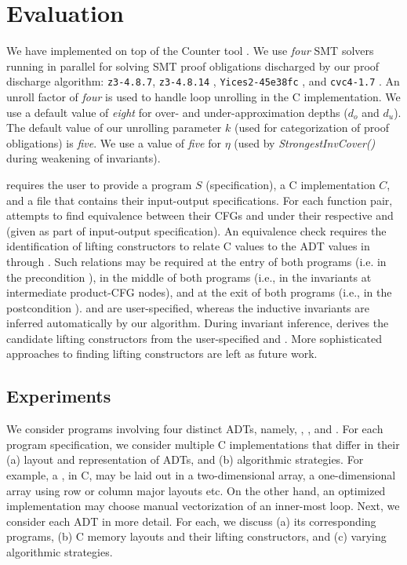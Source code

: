 \chapter{Evaluation}
\label{sec:eval}

We have implemented \toolName{} on top of the Counter tool \cite{oopsla20}.
We use {\em four} SMT solvers running in parallel for solving
SMT proof obligations discharged by our proof discharge algorithm:
{\tt z3-4.8.7}, {\tt z3-4.8.14} \cite{z3}, {\tt Yices2-45e38fc} \cite{yices}, and {\tt cvc4-1.7} \cite{cvc4solver}.
An unroll factor of {\em four} is used to handle loop unrolling in the C implementation.
We use a default value of {\em eight} for over- and under-approximation depths ($d_o$ and $d_u$).
The default value of our unrolling parameter $k$ (used for categorization of proof obligations) is {\em five}.
We use a value of {\em five} for $\eta$ (used by {\em StrongestInvCover()} during weakening of \recursiveRelation{} invariants).

\toolName{} requires the user to provide a \SpecL{} program $S$ (specification), a C implementation $C$,
and a file that contains their input-output specifications.
For each function pair, \toolName{} attempts to find equivalence between their CFGs \sprog{} and \cprog{}
under their respective \pre{} and \post{} (given as part of input-output specification).
An equivalence check requires the identification of lifting constructors to relate C
values to the ADT values in \SpecL{} through  \recursiveRelations{}.
Such relations may be required at the entry of both programs (i.e. in the precondition \pre{}),
in the middle of both programs (i.e., in the invariants at intermediate product-CFG nodes),
and at the exit of both programs (i.e., in the postcondition \post{}).
\pre{} and \post{} are user-specified, whereas the inductive invariants are
inferred automatically by our algorithm.
During invariant inference, \toolName{} derives the candidate lifting constructors
from the user-specified \pre{} and \post{}.
More sophisticated approaches to finding lifting constructors are left as future work.

\section{Experiments}
\label{sec:experiments}
We consider programs involving four distinct ADTs, namely,
 ,  ,  
and  .
For each \SpecL{} program specification, we consider multiple
C implementations that differ in their (a) layout and representation of ADTs, and
(b) algorithmic strategies. For example, a , in C, may be laid out
in a two-dimensional array, a one-dimensional array using row or column major
layouts etc. On the other hand, an optimized implementation may choose manual vectorization
of an inner-most loop. Next, we consider each ADT in more detail. For each,
we discuss (a) its corresponding programs, (b) C memory layouts and their lifting
constructors, and (c) varying algorithmic strategies.

